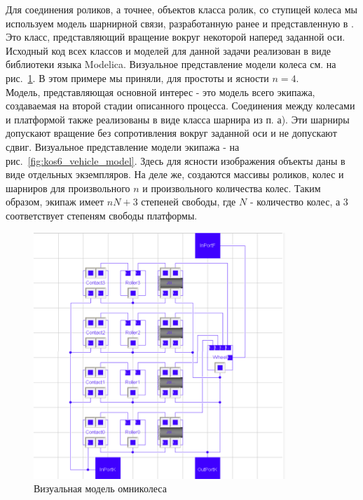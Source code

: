\documentclass[12pt]{article}
\begin{document}
Для соединения роликов, а точнее, объектов класса ролик, со ступицей колеса мы используем модель шарнирной связи, разработанную ранее и представленную в \cite{kos5}. Это класс, представляющий вращение вокруг некоторой наперед заданной оси. Исходный код всех классов и моделей для данной задачи реализован в виде библиотеки языка Modelica. Визуальное представление модели колеса см. на рис.~\ref{fig:kos5_wheel_model}. В этом примере мы приняли, для простоты и ясности $n = 4$.\\

Модель, представляющая основной интерес - это модель всего экипажа, создаваемая на второй стадии описанного процесса. Соединения между колесами и платформой также реализованы в виде класса шарнира из п. а). Эти шарниры допускают вращение без сопротивления вокруг заданной оси и не допускают сдвиг. Визуальное представление модели экипажа - на рис.~\ref{fig:kos6_vehicle_model}. Здесь для ясности изображения объекты даны в виде отдельных экземпляров. На деле же, создаются массивы роликов, колес и шарниров для произвольного $n$ и произвольного количества колес. Таким образом, экипаж имеет $nN+3$ степеней свободы, где $N$ - количество колес, а $3$ соответствует степеням свободы платформы.\\

\begin{figure}[h!]
    \centering
    \includegraphics[width=0.85\textwidth]{content/parts/3_friction/diploma/img/art/kos5_wheel_model.png}
    \caption{Визуальная модель омниколеса}
    \label{fig:kos5_wheel_model}
\end{figure}
\end{document}
